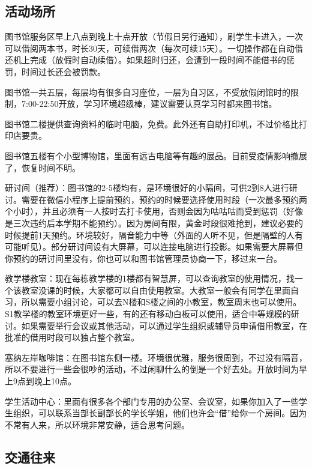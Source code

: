 \subsection*{活动场所}


图书馆服务区早上八点到晚上十点开放（节假日另行通知），刷学生卡进入，一次可以借阅两本书，时长30天，可续借两次（每次可续15天）。一切操作都在自动借还机上完成（放假时自动续借）。如果超时归还，会遭到一段时间不能借书的惩罚，时间过长还会被罚款。

图书馆一共五层，每层均有很多自习座位，一层为自习区，不受放假闭馆时的限制，7:00-22:50开放，学习环境超级棒，建议需要认真学习时都来图书馆。

图书馆二楼提供查询资料的临时电脑，免费。此外还有自助打印机，不过价格比打印店要贵。

图书馆五楼有个小型博物馆，里面有远古电脑等有趣的展品。目前受疫情影响撤展了，恢复时间不明。


研讨间（推荐）：图书馆的2-5楼均有，是环境很好的小隔间，可供2到8人进行研讨。需要在微信小程序上提前预约，预约的时候要选择使用时段（一次最多预约两个小时），并且必须有一人按时去打卡使用，否则会因为咕咕咕而受到惩罚（好像是三次违约后本学期不能预约）。因为房间有限，黄金时段很难抢到，建议必要的时候提前1天预约。环境较好，隔音能力中等（外面的人听不见，但是隔壁的人有可能听见）。部分研讨间设有大屏幕，可以连接电脑进行投影。如果需要大屏幕但你预约的研讨间里没有，你也可以和图书馆管理员协商一下，移过来一台。

教学楼教室：现在每栋教学楼的1楼都有智慧屏，可以查询教室的使用情况，找一个该教室没课的时候，大家都可以自由使用教室。大教室一般会有同学在里面自习，所以需要小组讨论，可以去N楼和S楼之间的小教室，教室周末也可以使用。S1教学楼的教室环境更好一些，有的还有移动白板可以使用，适合中等规模的研讨。如果需要举行会议或其他活动，可以通过学生组织或辅导员申请借用教室，在批准的借用时段可以独占整个教室。

塞纳左岸咖啡馆：在图书馆东侧一楼。环境很优雅，服务很周到，不过没有隔音，所以不要进行一些会很吵的活动，不过闲聊什么的倒是一个好去处。开放时间为早上9点到晚上10点。

学生活动中心：里面有很多各个部门专用的办公室、会议室，如果你加入了一些学生组织，可以联系当部长副部长的学长学姐，他们也许会“借”给你一个房间。因为不常有人来，所以环境非常安静，适合思考问题。

\subsection*{交通往来}

